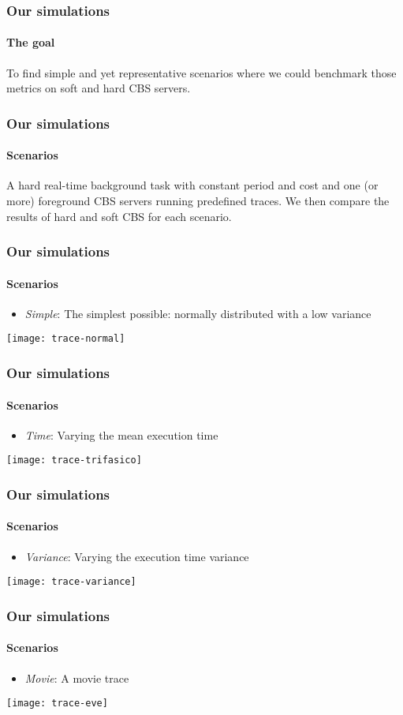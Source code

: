 \documentclass{beamer}
\newcommand{\Lum}{\textit{Simple}}
\newcommand{\Ldois}{\textit{Time}}
\newcommand{\Ltres}{\textit{Variance}}
\newcommand{\Lquatro}{\textit{Movie}}
\begin{document}
\begin{frame}
  \frametitle{Our simulations}
  \framesubtitle{The goal}
  
  To find simple and yet representative scenarios where we could
  benchmark those metrics on soft and hard CBS servers.
\end{frame}

\begin{frame}
  \frametitle{Our simulations}
  \framesubtitle{Scenarios}

  A hard real-time background task with constant period and cost and
  one (or more) foreground CBS servers running predefined traces. We
  then compare the results of hard and soft CBS for each scenario.
\end{frame}

\begin{frame}
  \frametitle{Our simulations}
  \framesubtitle{Scenarios}
  \begin{itemize}
  \item \Lum{}: The simplest possible: normally distributed with a low variance
  \end{itemize}
  \texttt{[image: trace-normal]}
\end{frame}


\begin{frame}
  \frametitle{Our simulations}
  \framesubtitle{Scenarios}
  \begin{itemize}
  \item \Ldois{}: Varying the mean execution time
  \end{itemize}
  \texttt{[image: trace-trifasico]}
\end{frame}

\begin{frame}
  \frametitle{Our simulations}
  \framesubtitle{Scenarios}
  \begin{itemize}
  \item \Ltres{}: Varying the execution time variance
  \end{itemize}
  \texttt{[image: trace-variance]}
\end{frame}

\begin{frame}
  \frametitle{Our simulations}
  \framesubtitle{Scenarios}
  \begin{itemize}
  \item \Lquatro{}: A movie trace
  \end{itemize}
  \texttt{[image: trace-eve]}
\end{frame}
\end{document}
